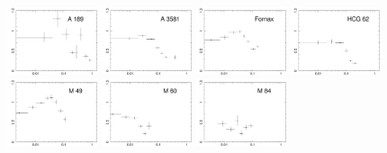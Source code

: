 \documentclass{aa}
\begin{document}
\begin{figure}[!]

                \includegraphics[width=0.236\textwidth,trim={0 0 0 0},clip]{fig_A189_Fe.pdf}
                \includegraphics[width=0.236\textwidth,trim={0 0 0 0},clip]{fig_A3581_Fe.pdf}
                \includegraphics[width=0.236\textwidth,trim={0 0 0 0},clip]{fig_Fornax_Fe.pdf}
                \includegraphics[width=0.236\textwidth,trim={0 0 0 0},clip]{fig_HCG62_Fe.pdf} \\
                \includegraphics[width=0.236\textwidth,trim={0 0 0 0},clip]{fig_M49_Fe.pdf}
                \includegraphics[width=0.236\textwidth,trim={0 0 0 0},clip]{fig_NGC4649_Fe.pdf}
                \includegraphics[width=0.236\textwidth,trim={0 0 0 0},clip]{fig_M84_Fe.pdf}

\end{figure}
\end{document}
